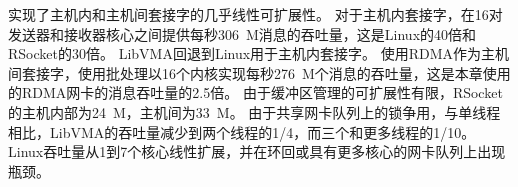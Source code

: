 



\sys 实现了主机内和主机间套接字的几乎线性可扩展性。
对于主机内套接字，\sys 在16对发送器和接收器核心之间提供每秒306~M消息的吞吐量，这是Linux的40倍和RSocket的30倍。
LibVMA回退到Linux用于主机内套接字。
使用RDMA作为主机间套接字，\sys 使用批处理以16个内核实现每秒276~M个消息的吞吐量，这是本章使用的RDMA网卡的消息吞吐量的2.5倍。
由于缓冲区管理的可扩展性有限，RSocket的主机内部为24~M，主机间为33~M。
由于共享网卡队列上的锁争用，与单线程相比，LibVMA的吞吐量减少到两个线程的1/4，而三个和更多线程的1/10。
Linux吞吐量从1到7个核心线性扩展，并在环回或具有更多核心的网卡队列上出现瓶颈。


